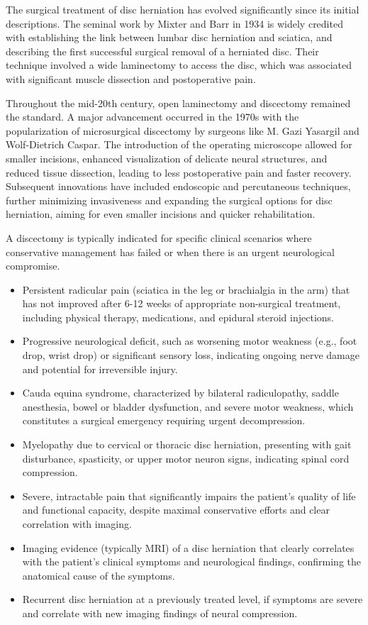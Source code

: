 The surgical treatment of disc herniation has evolved significantly since its initial descriptions. The seminal work by Mixter and Barr in 1934 is widely credited with establishing the link between lumbar disc herniation and sciatica, and describing the first successful surgical removal of a herniated disc. Their technique involved a wide laminectomy to access the disc, which was associated with significant muscle dissection and postoperative pain.

Throughout the mid-20th century, open laminectomy and discectomy remained the standard. A major advancement occurred in the 1970s with the popularization of microsurgical discectomy by surgeons like M. Gazi Yasargil and Wolf-Dietrich Caspar. The introduction of the operating microscope allowed for smaller incisions, enhanced visualization of delicate neural structures, and reduced tissue dissection, leading to less postoperative pain and faster recovery. Subsequent innovations have included endoscopic and percutaneous techniques, further minimizing invasiveness and expanding the surgical options for disc herniation, aiming for even smaller incisions and quicker rehabilitation.

A discectomy is typically indicated for specific clinical scenarios where conservative management has failed or when there is an urgent neurological compromise.

\begin{itemize}
  \item Persistent radicular pain (sciatica in the leg or brachialgia in the arm) that has not improved after 6-12 weeks of appropriate non-surgical treatment, including physical therapy, medications, and epidural steroid injections.
  \item Progressive neurological deficit, such as worsening motor weakness (e.g., foot drop, wrist drop) or significant sensory loss, indicating ongoing nerve damage and potential for irreversible injury.
  \item Cauda equina syndrome, characterized by bilateral radiculopathy, saddle anesthesia, bowel or bladder dysfunction, and severe motor weakness, which constitutes a surgical emergency requiring urgent decompression.
  \item Myelopathy due to cervical or thoracic disc herniation, presenting with gait disturbance, spasticity, or upper motor neuron signs, indicating spinal cord compression.
  \item Severe, intractable pain that significantly impairs the patient's quality of life and functional capacity, despite maximal conservative efforts and clear correlation with imaging.
  \item Imaging evidence (typically MRI) of a disc herniation that clearly correlates with the patient's clinical symptoms and neurological findings, confirming the anatomical cause of the symptoms.
  \item Recurrent disc herniation at a previously treated level, if symptoms are severe and correlate with new imaging findings of neural compression.
\end{itemize}

